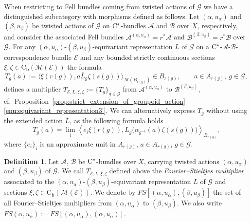 \documentclass[11 pt, leqno]{amsart}
\numberwithin{equation}{section}
\theoremstyle{plain}
\theoremstyle{definition}
\newtheorem {defn}[thm] {Definition}
\newcommand*{\contb}{\mathrm{C_b}}%
\newcommand{\B}{\mathcal B}
\newcommand{\M}{\mathcal M}
\newcommand{\G}{\mathcal G} %
\newcommand{\EE}{\mathcal E}
\newcommand{\A}{\mathcal A}
\newcommand{\cst}{\ifmmode\mathrm{C}^*\else{$\mathrm{C}^*$}\fi}
\begin{document}
When restricting to Fell bundles coming from twisted actions of $\G$ we have a distinguished subcategory with morphisms defined as follows. 
Let $(\alpha,u_{\alpha})$ and $(\beta,u_{\beta})$ be twisted actions of $\G$ on $\cst$-bundles $\A$ and $\B$ over $X$, respectively, and consider the associated Fell bundles $\A^{(\alpha,u_{\alpha})}=r^*\A$ and $\B^{(\beta,u_{\beta})}=r^*\B$ over $\G$.
For any  $(\alpha,u_{\alpha})$-$(\beta,u_{\beta})$-equivariant representation $L$ of $\G$ on a $\cst$-$\A$-$\B$-correspondence bundle $\EE$ and any bounded strictly continuous sections $\xi,\zeta\in \contb(\M(\EE))$ the formula  
\[
    T_{g}(a) := \langle \xi(r(g)), a \overline{L}_{g} \zeta(s(g)) \rangle_{\M(B_{r(g)})} \in B_{r(g)}, \qquad a\in A_{r(g)},\ g\in \G,
\]
defines a multiplier $T_{\EE,L,\xi,\zeta}:=\{T_g\}_{g\in \G}$ from $\A^{(\alpha,u_{\alpha})}$ to $\B^{(\beta,u_{\beta})}$, cf.\ Proposition~\ref{prop:strict_extension_of_groupoid_action}\ref{enu:equivariant_representation3'}. 
We can alternatively express $T_{g}$ without using the extended action $\overline{L}$, as the following formula holds
\[
    T_{g}(a)=\lim_{i} \left\langle e_i \xi(r(g)),  L_{g}\Big(\alpha_{g^{-1}}(a)\zeta(s(g))\Big)\right\rangle_{B_{r(g)}} , %
\]
where $\{e_i\}_{i}$ is an approximate unit in $A_{r(g)}$, $a\in A_{r(g)}$, $g\in \G$.

\begin{defn} 
Let $\A$, $\B$  be $\cst$-bundles over $X$, carrying twisted actions $(\alpha,u_\alpha)$ and $(\beta,u_\beta)$ of $\G$.
We call $T_{\EE,L,\xi,\zeta}$ defined above the \emph{Fourier--Stieltjes multiplier} associated to the $(\alpha,u_{\alpha})$-$(\beta,u_{\beta})$-equivariant representation $L$ of $\G$ and sections $\xi,\zeta\in \contb(\M(\EE))$. 
We denote by $FS[(\alpha,u_{\alpha}),(\beta,u_{\beta})]$ the set of all Fourier--Stieltjes multipliers from $(\alpha,u_{\alpha})$ to $(\beta,u_{\beta})$. 
We also write $FS(\alpha,u_{\alpha}):=FS[(\alpha,u_{\alpha}),(\alpha,u_{\alpha})]$.
\end{defn}
\end{document}

